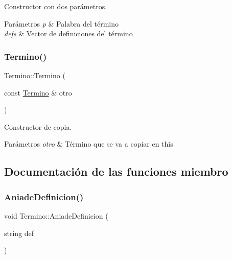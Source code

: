 Constructor con dos parámetros. 


\begin{DoxyParams}{Parámetros}
{\em p} & Palabra del término \\
\hline
{\em defs} & Vector de definiciones del término \\
\hline
\end{DoxyParams}
\mbox{\label{classTermino_a5614ae8912f6aabd677762cc6d10f2c8}} 
\subsubsection{\texorpdfstring{Termino()}{Termino()}\hspace{0.1cm}{\footnotesize\ttfamily [2/2]}}
{\footnotesize\ttfamily Termino\+::\+Termino (\begin{DoxyParamCaption}\item[{const \mbox{\hyperlink{classTermino}{Termino}} \&}]{otro }\end{DoxyParamCaption})}



Constructor de copia. 


\begin{DoxyParams}{Parámetros}
{\em otro} & Término que se va a copiar en this \\
\hline
\end{DoxyParams}


\subsection{Documentación de las funciones miembro}
\mbox{\label{classTermino_a93fed012290bc28881288cfd095c8500}} 
\subsubsection{\texorpdfstring{AniadeDefinicion()}{AniadeDefinicion()}}
{\footnotesize\ttfamily void Termino\+::\+Aniade\+Definicion (\begin{DoxyParamCaption}\item[{string}]{def }\end{DoxyParamCaption})}



